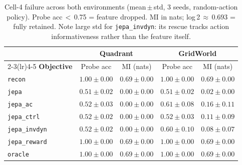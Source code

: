 \begin{table}[t]
\centering
\caption{Cell-4 failure across both environments (mean\,$\pm$\,std, 3 seeds, random-action policy). Probe acc\,$<$\,0.75 = feature dropped. MI in nats; log\,2\,$\approx$\,0.693 = fully retained. Note large std for \texttt{jepa\_invdyn}: its rescue tracks action informativeness rather than the feature itself.}
\label{tab:cell4_failure}
\begin{tabular}{lcccc}
\toprule
 & \multicolumn{2}{c}{\textbf{Quadrant}} & \multicolumn{2}{c}{\textbf{GridWorld}} \\
\cmidrule(lr){2-3}\cmidrule(lr){4-5}
\textbf{Objective} & Probe acc & MI (nats) & Probe acc & MI (nats) \\
\midrule
  \texttt{recon} & $1.00 \pm 0.00$ & $0.69 \pm 0.00$ & $1.00 \pm 0.00$ & $0.69 \pm 0.00$ \\
  \texttt{jepa} & $0.51 \pm 0.02$ & $0.00 \pm 0.00$ & $0.51 \pm 0.02$ & $0.02 \pm 0.00$ \\
  \texttt{jepa\_ac} & $0.52 \pm 0.03$ & $0.00 \pm 0.00$ & $0.61 \pm 0.08$ & $0.16 \pm 0.11$ \\
  \texttt{jepa\_ctrl} & $0.52 \pm 0.02$ & $0.00 \pm 0.00$ & $0.52 \pm 0.03$ & $0.11 \pm 0.09$ \\
  \texttt{jepa\_invdyn} & $0.52 \pm 0.02$ & $0.00 \pm 0.00$ & $0.60 \pm 0.10$ & $0.08 \pm 0.07$ \\
  \texttt{jepa\_reward} & $1.00 \pm 0.00$ & $0.69 \pm 0.00$ & $1.00 \pm 0.00$ & $0.69 \pm 0.00$ \\
  \texttt{oracle} & $1.00 \pm 0.00$ & $0.69 \pm 0.00$ & $1.00 \pm 0.00$ & $0.69 \pm 0.00$ \\
\bottomrule
\end{tabular}
\end{table}